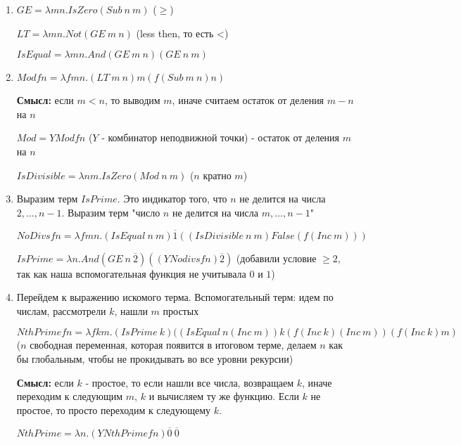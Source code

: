 \begin{enumerate}
    \item $GE=\lambda mn.IsZero(Sub \: n \: m)$ ($\geq$)
    \par $LT=\lambda mn.Not(GE \: m \: n)$ (less then, то есть <)
    \par $IsEqual=\lambda mn.And(GE \: m \: n)(GE \: n \: m)$
    \item $Modfn = \lambda fmn.(LT \: m \: n)m(f (Sub \: m \: n) n)$
    \par \textbf{Смысл:} если $m<n$, то выводим $m$, иначе считаем остаток от деления $m-n$ на $n$
    \par $Mod = YModfn$ ($Y$ - комбинатор неподвижной точки) - остаток от деления $m$ на $n$
    \par $IsDivisible=\lambda nm.IsZero(Mod \: n \: m)$ ($n$ кратно $m$)
    \item Выразим терм $IsPrime$. Это индикатор того, что $n$ не делится на числа $2,\ldots,n-1$. Выразим терм "число $n$ не делится на числа $m, \ldots, n-1$"
    \par $NoDivsfn=\lambda fmn.(IsEqual \: n \: m)\overline{1}((IsDivisible \: n \: m)False(f(Inc \: m)))$
    \par $IsPrime = \lambda n.And(GE \: n \: \overline{2})((YNodivsfn)\overline{2})$ (добавили условие $\geq 2$, так как наша вспомогательная функция не учитывала $0$ и $1$)
    \item Перейдем к выражению искомого терма. Вспомогательный терм: идем по числам, рассмотрели $k$, нашли $m$ простых
    \par $NthPrimefn=\lambda fkm.(IsPrime \: k)((IsEqual \: n(Inc \: m))k(f(Inc \: k)(Inc \: m))(f(Inc \: k)m)$ ($n$ свободная переменная, которая появится в итоговом терме, делаем $n$ как бы глобальным, чтобы не прокидывать во все уровни рекурсии)
    \par \textbf{Смысл:} если $k$ - простое, то если нашли все числа, возвращаем $k$, иначе переходим к следующим $m$, $k$ и вычисляем ту же функцию. Если $k$ не простое, то просто переходим к следующему $k$.
    \par $NthPrime=\lambda n.(YNthPrimefn)\overline{0}\:\overline{0}$
\end{enumerate}